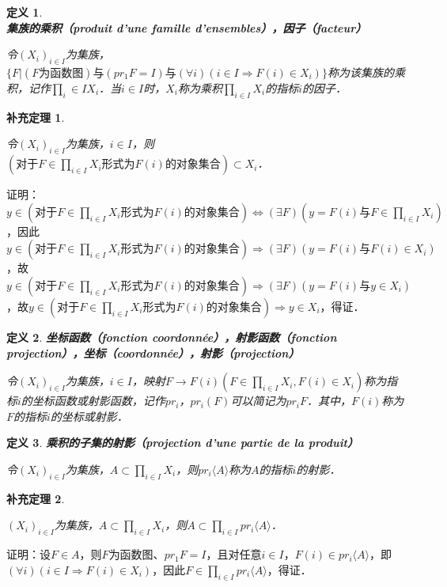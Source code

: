 \documentclass[12pt, a4paper, oneside]{book}
\newtheorem{cor}{补充定理}
\newtheorem{de}{定义}
\begin{document}
			\begin{de}
				\textbf{集族的乘积（produit d'une famille d'ensembles），因子（facteur）}
				\par
				令$(X_i)_{i\in I}$为集族，$\{F|(F\text{为函数图})\text{与}(pr_1F= I)\text{与}(\forall i)(i\in I\Rightarrow F(i)\in X_i)\}$称为该集族的乘积，记作$\prod\limits_i\in IX_i$．当$i\in I$时，$X_i$称为乘积$\prod\limits_{i\in I}X_i$的指标$i$的因子．			
			\end{de}
			
			\begin{cor}\label{cor125}
				\hfill\par
				令$(X_i)_{i\in I}$为集族，$i\in I$，则$(\text{对于}F\in \prod\limits_{i\in I}X_i\text{形式为}F(i)\text{的对象集合})\subset X_i$．
			\end{cor}
			证明：$y\in (\text{对于}F\in \prod\limits_{i\in I}X_i\text{形式为}F(i)\text{的对象集合})\Leftrightarrow (\exists F)(y=F(i)\text{与}F\in \prod\limits_{i\in I}X_i)$，因此$y\in (\text{对于}F\in \prod\limits_{i\in I}X_i\text{形式为}F(i)\text{的对象集合})\Rightarrow (\exists F)(y=F(i)\text{与}F(i)\in X_i)$，故$y\in (\text{对于}F\in \prod\limits_{i\in I}X_i\text{形式为}F(i)\text{的对象集合})\Rightarrow (\exists F)(y=F(i)\text{与}y\in X_i)$，故$y\in (\text{对于}F\in \prod\limits_{i\in I}X_i\text{形式为}F(i)\text{的对象集合})\Rightarrow y\in X_i$，得证．

			\begin{de}
				\textbf{坐标函数（fonction coordonnée），射影函数（fonction projection），坐标（coordonnée），射影（projection）}
				\par
				令$(X_i)_{i\in I}$为集族，$i\in I$，映射$F\to F(i)(F\in \prod\limits_{i\in I}X_i, F(i)\in X_i)$称为指标$i$的坐标函数或射影函数，记作$pr_i$，$pr_i(F)$可以简记为$pr_iF$．其中，$F(i)$称为$F$的指标$i$的坐标或射影．
			\end{de}

			\begin{de}
				\textbf{乘积的子集的射影（projection d'une partie de la produit）}
				\par
				令$(X_i)_{i\in I}$为集族，$A\subset \prod\limits_{i\in I}X_i$，则$pr_i\langle A \rangle $称为$A$的指标$i$的射影．
			\end{de}
						
			\begin{cor}\label{cor126}
				\hfill\par
				$(X_i)_{i\in I}$为集族，$A\subset \prod\limits_{i\in I}X_i$，则$A\subset \prod\limits_{i\in I}pr_i\langle A \rangle $．
			\end{cor}
			证明：设$F\in A$，则$F$为函数图、$pr_1F= I$，且对任意$i\in I$，$F(i)\in pr_i\langle A \rangle $，即$(\forall i)(i\in I\Rightarrow F(i)\in X_i)$，因此$F\in \prod\limits_{i\in I}pr_i\langle A \rangle $，得证．
\end{document}
